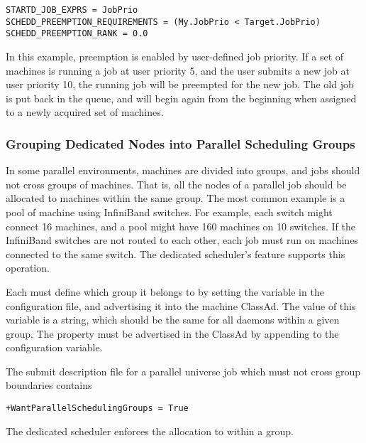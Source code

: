 \begin{verbatim}
STARTD_JOB_EXPRS = JobPrio
SCHEDD_PREEMPTION_REQUIREMENTS = (My.JobPrio < Target.JobPrio)
SCHEDD_PREEMPTION_RANK = 0.0
\end{verbatim}

In this example, preemption is enabled by user-defined job priority. 
If a set of machines is running a job at user priority 5,
and the user submits a new job at user priority 10, 
the running job will be preempted for the new job.
The old job is put back in the queue, and will begin again
from the beginning when assigned to a newly acquired set of machines.

\subsubsection{\label{sec:Configure-Dedicated-Groups}
Grouping Dedicated Nodes into Parallel Scheduling Groups}

In some parallel environments, machines are divided into groups, and
jobs should not cross groups of machines.
That is, all the nodes of a parallel
job should be allocated to machines within the same group.  
The most common example is a pool of machine using InfiniBand switches.
For example, 
each switch might connect 16 machines, 
and a pool might have 160 machines on 10 switches.
If the InfiniBand switches are not routed to each other, 
each job must run on machines connected to the same switch.
The dedicated scheduler's 
 feature supports this operation.

Each  must define which group it belongs to by setting the 
 variable in the configuration file, and 
advertising it into the machine ClassAd.  
The value of this variable is a string,
which should be the same for all  daemons within a given group.
The property must be advertised in the  ClassAd
by appending 
to the  configuration variable.

The submit description file for a parallel universe job which
must not cross group boundaries contains 
\begin{verbatim}
+WantParallelSchedulingGroups = True
\end{verbatim}

The dedicated scheduler enforces the allocation to within a group.

